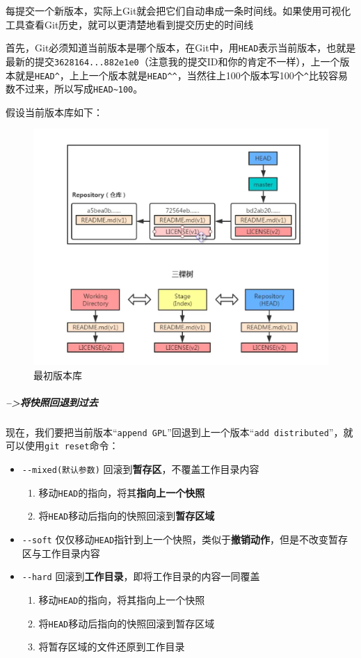 \documentclass[UTF8,a4paper,12pt]{ctexbook}
\begin{document}
			每提交一个新版本，实际上Git就会把它们自动串成一条时间线。如果使用可视化工具查看Git历史，就可以更清楚地看到提交历史的时间线
			
			首先，Git必须知道当前版本是哪个版本，在Git中，用\verb|HEAD|表示当前版本，也就是最新的提交\verb|3628164...882e1e0|（注意我的提交ID和你的肯定不一样），上一个版本就是\verb|HEAD^|，上上一个版本就是\verb|HEAD^^|，当然往上100个版本写100个\verb|^|比较容易数不过来，所以写成\verb|HEAD~100|。
			
			假设当前版本库如下：
			\begin{figure}
				\centering
				\includegraphics[scale = 0.7]{figure/reset-original.png}
				\caption{最初版本库}
			\end{figure}
			
			\subparagraph{-->将快照回退到过去}
				现在，我们要把当前版本“\verb|append GPL|”回退到上一个版本“\verb|add distributed|”，就可以使用\verb|git reset|命令：
			
				\begin{itemize}
					\item \verb|--mixed(默认参数)| 回滚到\textbf{暂存区}，不覆盖工作目录内容
						\begin{enumerate}
							\item 移动\verb|HEAD|的指向，将其\textbf{指向上一个快照}
							\item 将\verb|HEAD|移动后指向的快照回滚到\textbf{暂存区域}
						\end{enumerate}
					\item \verb|--soft| 仅仅移动\verb|HEAD|指针到上一个快照，类似于\textbf{撤销动作}，但是不改变暂存区与工作目录内容
					\item \verb|--hard| 回滚到\textbf{工作目录}，即将工作目录的内容一同覆盖
						\begin{enumerate}
							\item 移动\verb|HEAD|的指向，将其指向上一个快照
							\item 将\verb|HEAD|移动后指向的快照回滚到暂存区域
							\item 将暂存区域的文件还原到工作目录
						\end{enumerate}
				\end{itemize}
				
\end{document}
